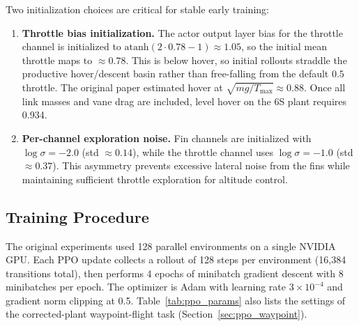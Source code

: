 \documentclass[conference]{IEEEtran}
\begin{document}
Two initialization choices are critical for stable early training:

\begin{enumerate}
    \item \textbf{Throttle bias initialization.} The actor output layer bias for the throttle channel is initialized to $\text{atanh}(2 \cdot 0.78 - 1) \approx 1.05$, so the initial mean throttle maps to $\approx 0.78$. This is below hover, so initial rollouts straddle the productive hover/descent basin rather than free-falling from the default $0.5$ throttle. The original paper estimated hover at $\sqrt{mg / T_{\max}} \approx 0.88$. Once all link masses and vane drag are included, level hover on the 6S plant requires 0.934.
    \item \textbf{Per-channel exploration noise.} Fin channels are initialized with $\log\sigma = -2.0$ (std $\approx 0.14$), while the throttle channel uses $\log\sigma = -1.0$ (std $\approx 0.37$). This asymmetry prevents excessive lateral noise from the fins while maintaining sufficient throttle exploration for altitude control.
\end{enumerate}

\subsection{Training Procedure}

The original experiments used 128 parallel environments on a single NVIDIA GPU. Each PPO update collects a rollout of 128 steps per environment (16{,}384 transitions total), then performs 4 epochs of minibatch gradient descent with 8 minibatches per epoch. The optimizer is Adam with learning rate $3 \times 10^{-4}$ and gradient norm clipping at 0.5. Table~\ref{tab:ppo_params} also lists the settings of the corrected-plant waypoint-flight task (Section~\ref{sec:ppo_waypoint}).
\end{document}
